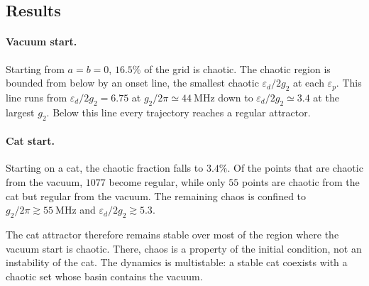 \documentclass[aps,prx,reprint,floatfix,amsmath,amssymb,longbibliography]{revtex4-2}
\begin{document}
\subsection{Results}
\label{app:lyap_results}

\paragraph*{Vacuum start.}
Starting from $a = b = 0$, $16.5\%$ of the grid is chaotic. The chaotic region is bounded from below by an onset line, the smallest chaotic $\varepsilon_d/2g_2$ at each $\varepsilon_p$. This line runs from $\varepsilon_d/2g_2 = 6.75$ at $g_2/2\pi \simeq 44~\mathrm{MHz}$ down to $\varepsilon_d/2g_2 \simeq 3.4$ at the largest $g_2$. Below this line every trajectory reaches a regular attractor.

\paragraph*{Cat start.}
Starting on a cat, the chaotic fraction falls to $3.4\%$. Of the points that are chaotic from the vacuum, $1077$ become regular, while only $55$ points are chaotic from the cat but regular from the vacuum. The remaining chaos is confined to $g_2/2\pi \gtrsim 55~\mathrm{MHz}$ and $\varepsilon_d/2g_2 \gtrsim 5.3$.

The cat attractor therefore remains stable over most of the region where the vacuum start is chaotic. There, chaos is a property of the initial condition, not an instability of the cat. The dynamics is multistable: a stable cat coexists with a chaotic set whose basin contains the vacuum.
\end{document}
